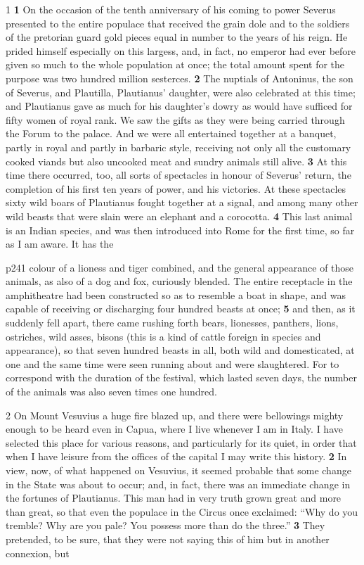 1 \textbf{1} On the occasion of the tenth anniversary of his coming to power Severus presented to the entire populace that received the grain dole and to the soldiers of the pretorian guard gold pieces equal in number to the years of his reign. He prided himself especially on this largess, and, in fact, no emperor had ever before given so much to the whole population at once; the total amount spent for the purpose was two hundred million sesterces. \textbf{2} The nuptials of Antoninus, the son of Severus, and Plautilla, Plautianus' daughter, were also celebrated at this time; and Plautianus gave as much for his daughter's dowry as would have sufficed for fifty women of royal rank. We saw the gifts as they were being carried through the Forum to the palace. And we were all entertained together at a banquet, partly in royal and partly in barbaric style, receiving not only all the customary cooked viands but also uncooked meat and sundry animals still alive. \textbf{3} At this time there occurred, too, all sorts of spectacles in honour of Severus' return, the completion of his first ten years of power, and his victories. At these spectacles sixty wild boars of Plautianus fought together at a signal, and among many other wild beasts that were slain were an elephant and a corocotta. \textbf{4} This last animal is an Indian species, and was then introduced into Rome for the first time, so far as I am aware. It has the

p241 colour of a lioness and tiger combined, and the general appearance of those animals, as also of a dog and fox, curiously blended. The entire receptacle in the amphitheatre had been constructed so as to resemble a boat in shape, and was capable of receiving or discharging four hundred beasts at once; \textbf{5} and then, as it suddenly fell apart, there came rushing forth bears, lionesses, panthers, lions, ostriches, wild asses, bisons (this is a kind of cattle foreign in species and appearance), so that seven hundred beasts in all, both wild and domesticated, at one and the same time were seen running about and were slaughtered. For to correspond with the duration of the festival, which lasted seven days, the number of the animals was also seven times one hundred.

2 On Mount Vesuvius a huge fire blazed up, and there were bellowings mighty enough to be heard even in Capua, where I live whenever I am in Italy. I have selected this place for various reasons, and particularly for its quiet, in order that when I have leisure from the offices of the capital I may write this history. \textbf{2} In view, now, of what happened on Vesuvius, it seemed probable that some change in the State was about to occur; and, in fact, there was an immediate change in the fortunes of Plautianus. This man had in very truth grown great and more than great, so that even the populace in the Circus once exclaimed: ``Why do you tremble? Why are you pale? You possess more than do the three.'' \textbf{3} They pretended, to be sure, that they were not saying this of him but in another connexion, but

